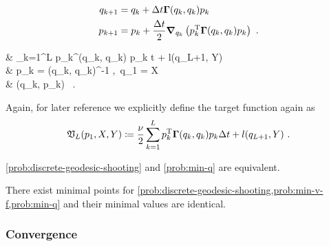 \begin{equation}
	\label{eq:discrete-hamiltonian-system}
	\begin{split}
		q_{k+1} &= q_k + \Delta t \mathbf{\Gamma}(q_k, q_k) p_k\\
		p_{k+1} &= p_k + \frac{\Delta t}{2} \grad_{q_k} \left(p_k^{\mathrm{T}} \mathbf{\Gamma}(q_k, q_k) p_k\right)\ .
	\end{split}
\end{equation}

\begin{problem}
\label{prob:discrete-geodesic-shooting}
	\begin{cases}
		 &  \sum_{k=1}^L p_k^\T \bGamma(q_k, q_k) p_k \Delta t + l(q_{L+1}, Y)\\
		 & p_k = \bGamma(q_k, q_k)^{-1} ,\ q_1 = X \\
		& (q_k, p_k) \ .
	\end{cases}
\end{problem}
Again, for later reference we explicitly define the target function again as
\begin{equation}
	\mathfrak{V}_L(p_1, X, Y) \coloneqq \frac{\nu}{2} \sum_{k=1}^L p_k^{\mathrm{T}} \mathbf{\Gamma}(q_k, q_k) p_k \Delta t + l(q_{L+1}, Y) \ .
\end{equation}

\begin{theorem}
	\label{theo:discrete-shooting-min-q-equivalence}
	\cref{prob:discrete-geodesic-shooting} and \cref{prob:min-q} are equivalent.
\end{theorem}

\begin{theorem}
	\label{theo:discrete-solutions-existence}
	There exist minimal points for \cref{prob:discrete-geodesic-shooting,prob:min-v-f,prob:min-q} and their minimal values are identical.
\end{theorem}


\subsubsection{Convergence}

